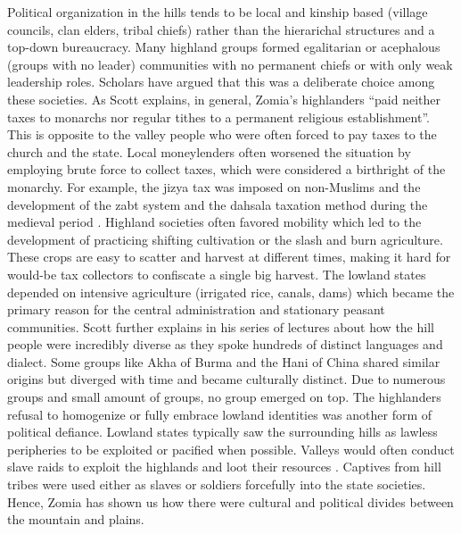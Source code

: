 Political organization in the hills tends to be local and kinship based (village councils, clan elders, tribal chiefs) rather than the hierarichal structures and a top\hyp{}down bureaucracy. Many highland groups formed egalitarian or acephalous (groups with no leader) communities with no permanent chiefs or with only weak leadership roles. Scholars have argued that this was a deliberate choice among these societies. As Scott explains, in general, Zomia's highlanders ``paid neither taxes to monarchs nor regular tithes to a permanent religious establishment”. This is opposite to the valley people who were often forced to pay taxes to the church and the state. Local moneylenders often worsened the situation by employing brute force to collect taxes, which were considered a birthright of the monarchy. For example, the jizya tax was imposed on non\hyp{}Muslims and the development of the zabt system and the dahsala taxation method during the medieval period \citep{moosvi1973production}. Highland societies often favored mobility which led to the development of practicing shifting cultivation or the slash and burn agriculture. These crops are easy to scatter and harvest at different times, making it hard for would\hyp{}be tax collectors to confiscate a single big harvest. The lowland states depended on intensive agriculture (irrigated rice, canals, dams) which became the primary reason for the central administration and stationary peasant communities. Scott further explains in his series of lectures  \citep{scott2005civilizations} about how the hill people were incredibly diverse as they spoke hundreds of distinct languages and dialect. Some groups like Akha of Burma and the Hani of China shared similar origins \citep{boonyasaranai2014common} but diverged with time and became culturally distinct. Due to numerous groups and small amount of groups, no group emerged on top. The highlanders refusal to homogenize or fully embrace lowland identities was another form of political defiance. Lowland states typically saw the surrounding hills as lawless peripheries to be exploited or pacified when possible. Valleys would often conduct slave raids to exploit the highlands and loot their resources \citep{walker1999legend}. Captives from hill tribes were used either as slaves or soldiers forcefully into the state societies. Hence, Zomia has shown us how there were cultural and political divides between the mountain and plains.

